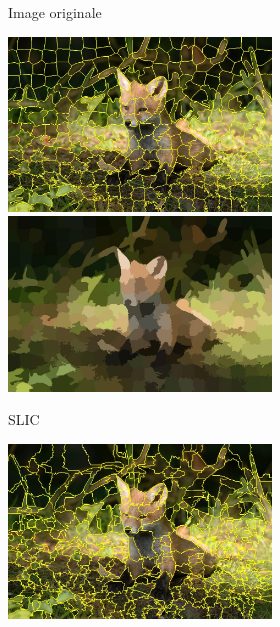 \begin{figure}
\begin{subfigure}{\textwidth}
\begin{subfigure}{0.25\textwidth}
    \caption*{Image originale}
\end{subfigure}%
\begin{subfigure}{0.25\textwidth}
    \includegraphics[width=\textwidth]{Chapitre2/fox_slic}
    \includegraphics[width=\textwidth]{Chapitre2/fox_slic_patchwork}
    \caption*{SLIC}
\end{subfigure}%
\begin{subfigure}{0.25\textwidth}
    \includegraphics[width=\textwidth]{Chapitre2/fox_quickshift}

\end{subfigure}
\end{subfigure}
\end{figure}
